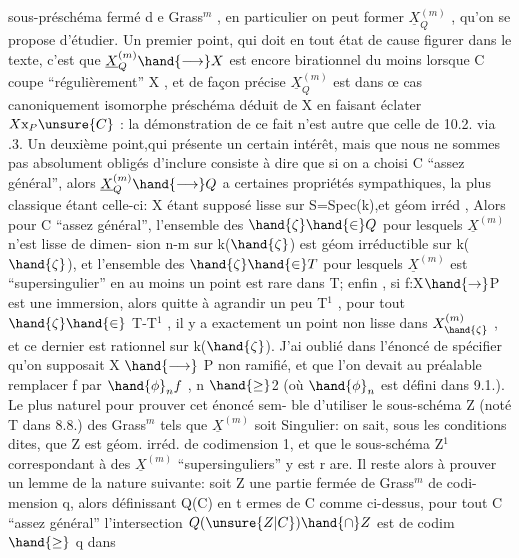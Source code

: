 
sous-préschéma fermé d e Grass$^{m}$ , en particulier on peut former $\underline{X}^{(m)}_{Q}$ ,
qu'on se propose d'étudier. Un premier point, qui doit en tout état de
cause figurer dans le texte, c'est que $\underline{X}^{(m)}_{Q} \hand{\longrightarrow} X$ est encore birationnel
du moins lorsque C coupe ``régulièrement'' X , et de façon précise $\underline{X}^{(m)}_{Q}$
est dans œ cas canoniquement isomorphe  préschéma déduit de X en
faisant éclater $X\mathrm{x}_{P}\unsure{C}$ : la démonstration de ce fait n'est autre que celle
de 10.2. via .3. Un deuxième point,qui présente un certain intérêt,
mais que nous ne sommes pas absolument obligés d'inclure consiste à
dire que si on a choisi C ``assez général'', alors $\underline{X}^{(m)}_{Q} \hand{\longrightarrow} Q$ a certaines
propriétés sympathiques, la plus classique étant celle-ci: X étant
supposé lisse sur S=Spec(k),et  géom irréd , Alors pour C ``assez
général'', l'ensemble des $\hand{\zeta}\hand{\in} Q$ pour lesquels $\underline{X}^{(m)}$ n'est lisse de dimen-%
sion n-m sur k($\hand{\zeta}$) est géom irréductible sur k($\hand{\zeta}$), et 
l'ensemble des $\hand{\zeta}\hand{\in} T$ pour lesquels $\underline{X}^{(m)}$ est ``supersingulier'' en au
moins un point est rare dans T;
 enfin , si f:X$\hand{\rightarrow}$P est une immersion, alors
quitte à agrandir un peu T$^{1}$ , pour tout $\hand{\zeta}\hand{\in}$ T-T$^{1}$ , il y a exactement un
\margin{$|$}point non lisse dans $X^{(m)}_{\hand{\zeta}}$ , et ce dernier est rationnel sur k($\hand{\zeta}$). J'ai
oublié dans l'énoncé de spécifier qu'on supposait X  $\hand{\longrightarrow}$ P non ramifié,
et que l'on devait au préalable remplacer f par $\hand{\phi}_{n}f$ , n $\hand{\geq}$2 (où $\hand{\phi}_{n}$ est
défini dans 9.1.). Le plus naturel  pour prouver cet énoncé sem-%
ble d'utiliser le sous-schéma Z (noté T dans 8.8.) des Grass$^{m}$ tels
que $\underline{X}^{(m)}$ soit Singulier: on sait, sous les conditions dites, que Z
est géom. irréd. de codimension 1, et que le sous-schéma Z$^{1}$ correspondant
à des $\underline{X}^{(m)}$ ``supersinguliers'' y est r are. Il reste alors à prouver un
lemme de la nature suivante: soit Z une partie fermée de Grass$^{m}$ de codi-%
mension q, alors définissant Q(C) en t ermes de C comme ci-dessus, pour
tout C ``assez général'' l'intersection $Q(\unsure{Z|C})\hand{\cap} Z$ est de codim $\hand{\geq}$ q dans

